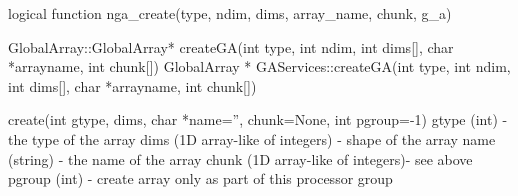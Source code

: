 \documentclass[12pt]{article}
\begin{document}
\begin{fapi}
\begin{fcode}
logical function nga_create(type, ndim, dims, array_name, chunk, g_a)
\end{fcode}
\begin{funcargs}
\end{funcargs}
\end{fapi}

\begin{cxxapi}
\begin{cxxcode}
GlobalArray::GlobalArray* createGA(int type, int ndim, int dims[],
                                   char *arrayname, int chunk[])
GlobalArray * GAServices::createGA(int type, int ndim, int dims[],
                                   char *arrayname, int chunk[])
\end{cxxcode}
\begin{funcargs}
\end{funcargs}
\end{cxxapi}

\begin{pyapi}
\begin{pycode}
create(int gtype, dims, char *name='', chunk=None, int pgroup=-1)
   gtype (int)                      - the type of the array
   dims (1D array-like of integers) - shape of the array
   name (string)                    - the name of the array
   chunk (1D array-like of integers)- see above
   pgroup (int)                     - create array only as part of
                                      this processor group
\end{pycode}
\end{pyapi}
\end{document}
